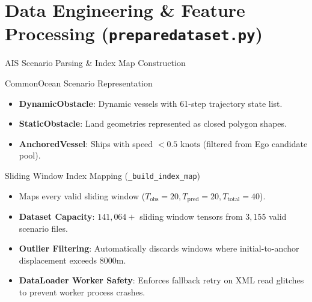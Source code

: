 \documentclass[t]{beamer}
\begin{document}
\section{Data Engineering \& Feature Processing (\texttt{preparedataset.py})}

\begin{frame}{AIS Scenario Parsing \& Index Map Construction}
    \begin{block}{CommonOcean Scenario Representation}
        \begin{itemize}
            \item \textbf{DynamicObstacle}: Dynamic vessels with 61-step trajectory state list.
            \item \textbf{StaticObstacle}: Land geometries represented as closed polygon shapes.
            \item \textbf{AnchoredVessel}: Ships with speed $<0.5\text{ knots}$ (filtered from Ego candidate pool).
        \end{itemize}
    \end{block}

    \begin{block}{Sliding Window Index Mapping (\texttt{\_build\_index\_map})}
        \begin{itemize}
            \item Maps every valid sliding window ($T_{\text{obs}} = 20, T_{\text{pred}} = 20, T_{\text{total}} = 40$).
            \item \textbf{Dataset Capacity}: $141,064+$ sliding window tensors from $3,155$ valid scenario files.
            \item \textbf{Outlier Filtering}: Automatically discards windows where initial-to-anchor displacement exceeds $8000\text{m}$.
            \item \textbf{DataLoader Worker Safety}: Enforces fallback retry on XML read glitches to prevent worker process crashes.
        \end{itemize}
    \end{block}
\end{frame}
\end{document}
